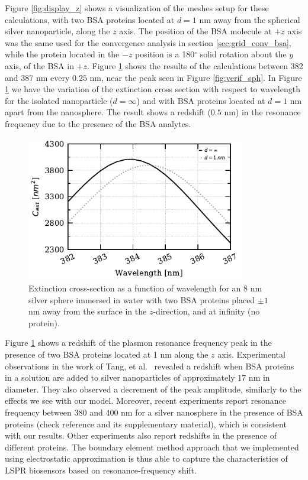 Figure \ref{fig:display_z} shows a visualization of the meshes setup for these 
calculations, with two BSA proteins located at $d=1$ nm away from the spherical 
silver nanoparticle, along the $z$ axis. The position of the BSA molecule at $+z$ 
axis was the same used for the convergence analysis in section \ref{sec:grid_conv_bsa},
while the protein located in the $-z$ position is a 180$^\circ$ solid rotation 
about the $y$ axis, of the BSA in $+z$.  Figure \ref{fig:2pz_response} shows the results
of the calculations between 382 and 387 nm every $0.25$ nm, near the peak seen in Figure
\ref{fig:verif_sph}. In Figure \ref{fig:2pz_response} we have the variation of the 
extinction cross section with respect to wavelength for the isolated nanoparticle 
($d=\infty$) and with BSA proteins located at $d=1$ nm apart from the nanosphere. The
result shows a redshift ($0.5$ nm) in the resonance frequency due to the presence of 
the BSA analytes.

\begin{figure} %
    \centering
    \includegraphics[width=0.85\textwidth]{2pz_R8nm.pdf} 
    \caption{Extinction cross-section as a function of wavelength for an $8$ nm
             silver sphere immersed in water with two BSA proteins placed 
             $\pm 1$ nm away from the surface in the $z$-direction, and at
             infinity (no protein).}
    \label{fig:2pz_response}
 \end{figure}

Figure \ref{fig:2pz_response} shows a redshift of the plasmon resonance frequency 
peak in the presence of two BSA proteins located at 1 nm along the $z$ axis. Experimental 
observations in the work of Tang, et al.~\cite{TangETal2010} revealed a redshift when 
BSA proteins in a solution are added to silver nanoparticles of approximately $17$ nm 
in diameter. They also observed a decrement of the peak amplitude, similarly to the 
effects we see with our model. Moreover, recent experiments \cite{PuETal2018} report 
resonance frequency between $380$ and $400$ nm for a silver nanosphere in the presence
of BSA proteins (check reference and its supplementary material), which is consistent with 
our results. Other experiments \cite{RaphaelETal2013} also report redshifts in the presence
of different proteins. The boundary element method approach that we implemented using 
electrostatic approximation is thus able to capture the characteristics of LSPR biosensors
based on resonance-frequency shift. 

